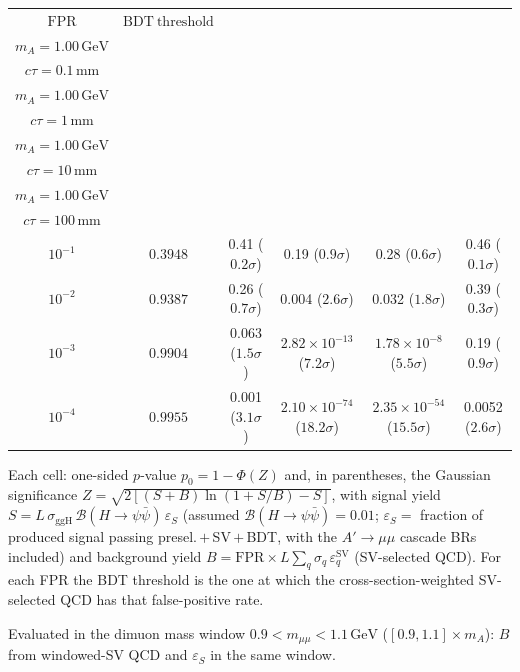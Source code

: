 \documentclass[10pt,a4paper]{article}
\begin{document}
{\begin{tabular}{cccccc}
\toprule
$\mathrm{FPR}$ & $\mathrm{BDT\ threshold}$ & \shortstack{$m_{\pi}=10\,\mathrm{GeV}$\\$m_{A}=1.00\,\mathrm{GeV}$\\$c\tau=0.1\,\mathrm{mm}$} & \shortstack{$m_{\pi}=10\,\mathrm{GeV}$\\$m_{A}=1.00\,\mathrm{GeV}$\\$c\tau=1\,\mathrm{mm}$} & \shortstack{$m_{\pi}=10\,\mathrm{GeV}$\\$m_{A}=1.00\,\mathrm{GeV}$\\$c\tau=10\,\mathrm{mm}$} & \shortstack{$m_{\pi}=10\,\mathrm{GeV}$\\$m_{A}=1.00\,\mathrm{GeV}$\\$c\tau=100\,\mathrm{mm}$} \\
\midrule
$10^{-1}$ & $0.3948$ & 0.41 ($0.2\sigma$) & 0.19 ($0.9\sigma$) & 0.28 ($0.6\sigma$) & 0.46 ($0.1\sigma$)\\
$10^{-2}$ & $0.9387$ & 0.26 ($0.7\sigma$) & 0.004 ($2.6\sigma$) & 0.032 ($1.8\sigma$) & 0.39 ($0.3\sigma$)\\
$10^{-3}$ & $0.9904$ & 0.063 ($1.5\sigma$) & $2.82\times10^{-13}$ ($7.2\sigma$) & $1.78\times10^{-8}$ ($5.5\sigma$) & 0.19 ($0.9\sigma$)\\
$10^{-4}$ & $0.9955$ & 0.001 ($3.1\sigma$) & $2.10\times10^{-74}$ ($18.2\sigma$) & $2.35\times10^{-54}$ ($15.5\sigma$) & 0.0052 ($2.6\sigma$)\\
\bottomrule
\end{tabular}

{\small Each cell: one-sided $p$-value $p_0=1-\Phi(Z)$ and, in parentheses, the Gaussian significance $Z=\sqrt{2\left[(S{+}B)\ln(1{+}S/B)-S\right]}$, with signal yield $S=L\,\sigma_{\mathrm{ggH}}\,\mathcal{B}(H\to\psi\bar{\psi})\,\varepsilon_S$ (assumed $\mathcal{B}(H\to\psi\bar{\psi})=0.01$; $\varepsilon_S=$ fraction of produced signal passing presel.\,$+$\,SV\,$+$\,BDT, with the $A'\to\mu\mu$ cascade BRs included) and background yield $B=\mathrm{FPR}\times L\sum_q\sigma_q\,\varepsilon_q^{\mathrm{SV}}$ (SV-selected QCD). For each FPR the BDT threshold is the one at which the cross-section-weighted SV-selected QCD has that false-positive rate.}

{\small Evaluated in the dimuon mass window $0.9<m_{\mu\mu}<1.1\,\mathrm{GeV}$ ($[0.9,1.1]\times m_A$): $B$ from windowed-SV QCD and $\varepsilon_S$ in the same window.}

}\clearpage
\end{document}
